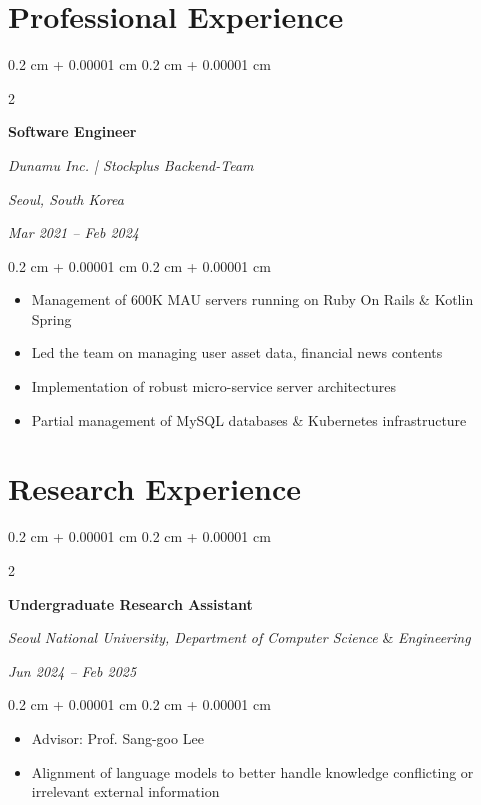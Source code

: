 \documentclass[10pt, letterpaper]{article}
\newenvironment{highlights}{
    \begin{itemize}[
        topsep=0.10 cm,
        parsep=0.10 cm,
        partopsep=0pt,
        itemsep=0pt,
        leftmargin=0.4 cm + 10pt
    ]
}{
    \end{itemize}
} %
\newenvironment{onecolentry}{
    \begin{adjustwidth}{
        0.2 cm + 0.00001 cm
    }{
        0.2 cm + 0.00001 cm
    }
}{
    \end{adjustwidth}
} %
\newenvironment{twocolentry}[2][]{
    \onecolentry
    \def\secondColumn{#2}
    \setcolumnwidth{\fill, 4.5 cm}
    \begin{paracol}{2}
}{
    \switchcolumn \raggedleft \secondColumn
    \end{paracol}
    \endonecolentry
} %
\begin{document}
    
    \section{Professional Experience}

        \begin{twocolentry}{
        \textit{Seoul, South Korea}    
            
        \textit{Mar 2021 – Feb 2024}}
            \textbf{Software Engineer}
            
            \textit{Dunamu Inc. | Stockplus Backend-Team}
        \end{twocolentry}

        \vspace{0.10 cm}
        \begin{onecolentry}
            \begin{highlights}
                \item Management of 600K MAU servers running on Ruby On Rails \& Kotlin Spring
                \item Led the team on managing user asset data, financial news contents
                \item Implementation of robust micro-service server architectures
                \item Partial management of MySQL databases \& Kubernetes infrastructure
            \end{highlights}
        \end{onecolentry}


    \section{Research Experience}

        \begin{twocolentry}{
            
        \textit{Jun 2024 – Feb 2025}}
            \textbf{Undergraduate Research Assistant}

            \textit{Seoul National University,  Department of Computer Science} \& \textit{Engineering}
        \end{twocolentry}

        \vspace{0.10 cm}
        \begin{onecolentry}
            \begin{highlights}
                \item Advisor: Prof. Sang-goo Lee
                \item Alignment of language models to better handle knowledge conflicting or irrelevant external information
            \end{highlights}
        \end{onecolentry}
\end{document}
